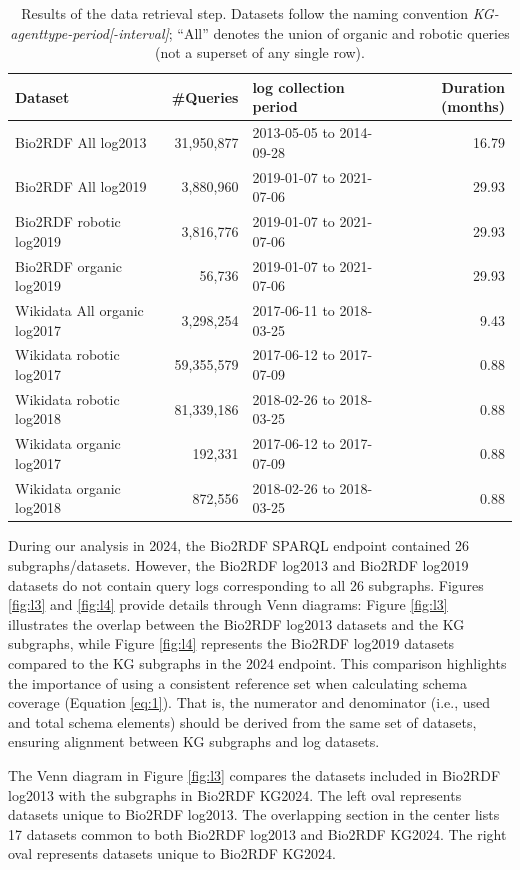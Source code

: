 \documentclass[sw]{iosart2x}
\begin{document}
\begin{table}[h!]
\centering
\caption{Results of the data retrieval step. Datasets follow the naming convention \emph{KG-agenttype-period[-interval]}; ``All'' denotes the union of organic and robotic queries (not a superset of any single row).}
\label{tab:1}
\begin{tabular}{l|r|l|r} 
\hline
\textbf{Dataset} & \#\textbf{Queries} & \textbf{log collection period} & \textbf{Duration (months)} \\ \hline
Bio2RDF All log2013 & 31,950,877 & 2013-05-05 to 2014-09-28 & 16.79 \\ 
Bio2RDF All log2019 & 3,880,960  & 2019-01-07 to 2021-07-06 & 29.93 \\ 
Bio2RDF robotic log2019 & 3,816,776  & 2019-01-07 to 2021-07-06 & 29.93 \\ 
Bio2RDF organic log2019 & 56,736 & 2019-01-07 to 2021-07-06 & 29.93 \\ 
Wikidata All organic log2017 & 3,298,254 & 2017-06-11 to 2018-03-25 & 9.43 \\ 
Wikidata robotic log2017 & 59,355,579 & 2017-06-12 to 2017-07-09 & 0.88 \\ 
Wikidata robotic log2018 & 81,339,186 & 2018-02-26 to 2018-03-25 & 0.88 \\ 
 Wikidata organic log2017&
192,331&
2017-06-12 to 2017-07-09&
0.88\\
Wikidata organic log2018&
872,556&
 2018-02-26 to 2018-03-25&
0.88\\
\hline
\end{tabular}
\end{table}

During our analysis in 2024, the Bio2RDF SPARQL endpoint contained 26 subgraphs/datasets. However, the Bio2RDF log2013 and Bio2RDF log2019 datasets do not contain query logs corresponding to all 26 subgraphs. Figures \ref{fig:l3} and \ref{fig:l4} provide details through Venn diagrams: Figure \ref{fig:l3} illustrates the overlap between the Bio2RDF log2013 datasets and the KG subgraphs, while Figure \ref{fig:l4} represents the Bio2RDF log2019 datasets compared to the KG subgraphs in the 2024 endpoint. This comparison highlights the importance of using a consistent reference set when calculating schema coverage (Equation \ref{eq:1}). That is, the numerator and denominator (i.e., used and total schema elements) should be derived from the same set of datasets, ensuring alignment between KG subgraphs and log datasets.

The Venn diagram in Figure \ref{fig:l3} compares the datasets included in Bio2RDF log2013 with the subgraphs in Bio2RDF KG2024. The left oval represents datasets unique to Bio2RDF log2013. The overlapping section in the center lists 17 datasets common to both Bio2RDF log2013 and Bio2RDF KG2024. The right oval represents datasets unique to Bio2RDF KG2024.
\end{document}
